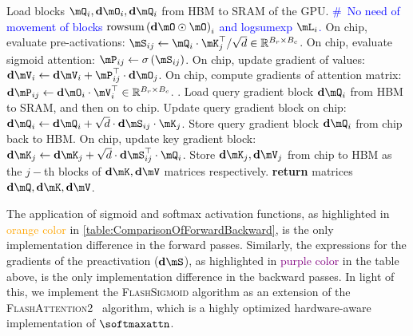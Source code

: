 \begin{algorithm}[!h]
\begin{algorithmic}[1]
                \State Load blocks $\mQ_i, \mathbf{d}\mO_i, \mathbf{d}\mQ_i$ from HBM to SRAM of the GPU.
                \State \qquad{} {\textcolor{blue}{\#\ No need of movement of blocks $\textrm{rowsum}\left(\mathbf{d}\mO\odot \mO\right)_i$ and logsumexp $\mL_i$.}}
                \State On chip, evaluate pre-activations: $\mS_{ij} \leftarrow \mQ_i\cdot \mK_j^\top / \sqrt{d}\in \mathbb{R}^{B_r\times B_c}$.
                \State On chip, evaluate sigmoid attention: $\mP_{ij} \leftarrow \sigma\left(\mS_{ij}\right)$.
                \State On chip, update gradient of values: $\mathbf{d}\mV_i \leftarrow \mathbf{d}\mV_i + \mP_{ij}^\top\cdot \mathbf{d}\mO_j$.
                \State On chip, compute gradients of attention matrix: $\mathbf{d}\mP_{ij} \leftarrow \mathbf{d}\mO_i\cdot \mV_i^\top\in\mathbb{R}^{B_r\times B_c}$.
                .
                \State Load query gradient block $\mathbf{d}\mQ_i$ from HBM to SRAM, and then on to chip.
                \State Update query gradient block on chip: $\mathbf{d}\mQ_i \leftarrow \mathbf{d}\mQ_i + \sqrt{d}\cdot \mathbf{d}\mS_{ij}\cdot \mK_j$.
                \State Store query gradient block $\mathbf{d}\mQ_i$ from chip back to HBM.
                \State On chip, update key gradient block: $\mathbf{d}\mK_j \leftarrow \mathbf{d}\mK_j + \sqrt{d}\cdot \mathbf{d}\mS_{ij}^\top\cdot \mQ_i$. 
            \EndFor
            \State Store $\mathbf{d}\mK_j, \mathbf{d}\mV_j$ from chip to HBM as the $j-$th blocks of $\mathbf{d}\mK, \mathbf{d}\mV$ matrices respectively. 
        \EndFor
        \State \textbf{return} matrices $\mathbf{d}\mQ, \mathbf{d}\mK, \mathbf{d}\mV$. 
    \EndProcedure
    \end{algorithmic}
\end{algorithm}
\noindent The application of sigmoid and softmax activation functions, as highlighted in {\textcolor{orange}{orange color}} in \cref{table:ComparisonOfForwardBackward}, is the only implementation difference in the forward passes.
Similarly, the expressions for the gradients of the preactivation ($\mathbf{d}\mS$), as highlighted in {\textcolor{purple}{purple color}} in the table above, is the only implementation difference in the backward passes. 
In light of this, we implement the \textsc{FlashSigmoid} algorithm as an extension of the \textsc{FlashAttention2}~\citep{DBLP:journals/corr/abs-2307-08691} algorithm, which is a highly optimized hardware-aware implementation of $\softmaxattn$. 

